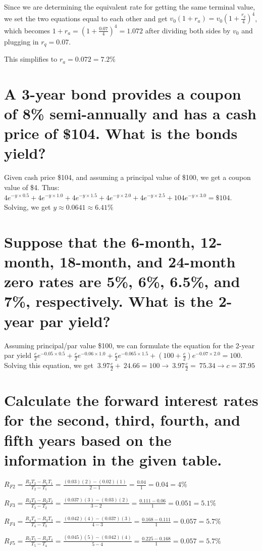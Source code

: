 \documentclass{article}
\begin{document}
\par\noindent\Large Since we are determining the equivalent rate for getting the same terminal value, we set the two equations equal to each other and get $v_{0}(1 + r_{a}) = v_{0}(1 + \frac{r_{q}}{4})^{4}$, which becomes $1 + r_{a} = (1 + \frac{0.07}{4})^{4} = 1.072$ after dividing both sides by $v_{0}$ and plugging in $r_{q} = 0.07$.\vspace{0.25cm}

\par\noindent\Large This simplifies to $r_{a} = 0.072 = 7.2\%$

\section{A 3-year bond provides a coupon of 8\% semi-annually and has a cash price of \$104. What is the bonds yield?}

\par\noindent\Large Given cash price \$104, and assuming a principal value of \$100, we get a coupon value of \$4.  Thus: $4e^{-y \times 0.5} + 4e^{-y \times 1.0} + 4e^{-y \times 1.5} + 4e^{-y \times 2.0} + 4e^{-y \times 2.5} + 104e^{-y \times 3.0} = \$104$.  Solving, we get $y \approx 0.0641 \approx 6.41\%$

\section{Suppose that the 6-month, 12-month, 18-month, and 24-month zero rates are 5\%, 6\%, 6.5\%, and 7\%, respectively. What is the 2-year par yield?}
\par\noindent\Large Assuming principal/par value \$100, we can formulate the equation for the 2-year par yield $\frac{c}{2}e^{-0.05 \times 0.5} + \frac{c}{2}e^{-0.06 \times 1.0} + \frac{c}{2}e^{-0.065 \times 1.5} + (100 + \frac{c}{2})e^{-0.07 \times 2.0} = 100$.  Solving this equation, we get $~3.97\frac{c}{2} + ~24.66 = 100 \rightarrow ~3.97\frac{c}{2} = ~75.34 \rightarrow c = 37.95$

\section{Calculate the forward interest rates for the second, third, fourth, and fifth years based on the information in the given table.}
\par\noindent\Large $R_{F2} = \frac{R_{2}T_{2} - R_{1}T_{1}}{T_{2} - T_{1}} = \frac{(0.03)(2) - (0.02)(1)}{2 - 1} = \frac{0.04}{1} = 0.04 = 4\%$
\par\noindent\Large $R_{F3} = \frac{R_{3}T_{3} - R_{2}T_{2}}{T_{3} - T_{2}} = \frac{(0.037)(3) - (0.03)(2)}{3 - 2} = \frac{0.111 - 0.06}{1} = 0.051 = 5.1\%$
\par\noindent\Large $R_{F4} = \frac{R_{4}T_{4} - R_{3}T_{3}}{T_{4} - T_{3}} = \frac{(0.042)(4) - (0.037)(3)}{4 - 3} = \frac{0.168 - 0.111}{1} = 0.057 = 5.7\%$
\par\noindent\Large $R_{F5} = \frac{R_{5}T_{5} - R_{4}T_{4}}{T_{5} - T_{4}} = \frac{(0.045)(5) - (0.042)(4)}{5 - 4} = \frac{0.225 - 0.168}{1} = 0.057 = 5.7\%$
\end{document}
